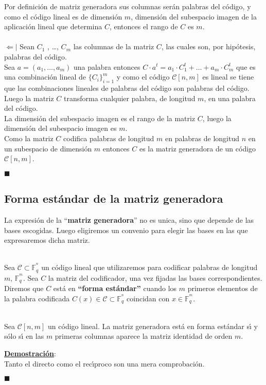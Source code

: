 Por definici\'on de matriz generadora sus columnas ser\'an palabras del
c\'odigo, y como el c\'odigo lineal es de dimensi\'on $m$, dimensi\'on
del subespacio imagen de la aplicaci\'on lineal que determina $C$, entonces
el rango de $C$ es $m$.\\ \\
%
$\Leftarrow |$ Sean $C_1$ , \dots, $C_m$ las columnas de la matriz $C$, las
cuales son, por hip\'otesis, palabras del c\'odigo.\\

Sea $a=(a_1,\dots,a_m )$ una palabra entonces $C\cdot a^t = a_1\cdot
C_1^t+\dots +a_m\cdot C_m^t$ que es una combinaci\'on lineal de
$\{C_i \}_{i=1}^m$ y como el c\'odigo $\mathcal{C}[n,m]$ es lineal se tiene
que las combinaciones lineales de palabras del c\'odigo son palabras del 
c\'odigo. Luego la matriz $C$ transforma cualquier palabra, de longitud $m$, 
en una palabra del c\'odigo.\\

La dimensi\'on del subespacio imagen es el rango de la matriz $C$, luego la
dimensi\'on del subespacio imagen es $m$.\\

Como la matriz $C$ codifica palabras de longitud $m$ en palabras de longitud
$n$ en un subespacio de dimensi\'on $m$ entonces $C$ es la matriz generadora
de un c\'odigo $\mathcal{C}[n,m]$.
\begin{flushright}
$\blacksquare$
\end{flushright}
%
\newpage
%
\subsection{Forma est\'andar de la matriz generadora}

La expresi\'on de la ``\textbf{matriz generadora}'' no es unica, sino que
depende de las bases escogidas. Luego eligiremos un convenio para elegir
las bases en las que expresaremos dicha matriz.
\begin{definicion}
\ \\
Sea $\mathcal{C}\subset \mathbb{F}^{^n}_q$ un c\'odigo lineal que utilizaremos
para codificar palabras de longitud $m$, $\mathbb{F}^{^m}_q$. Sea $C$ la
matriz del codificador, una vez fijadas las bases correspondientes. Diremos
que $C$ est\'a en \textbf{``forma est\'andar''} cuando los $m$ primeros elementos
de la palabra codificada $C(x)\in \mathcal{C}\subset \mathbb{F}^{^n}_q$
coincidan con $x\in \mathbb{F}^{^m}_q$.
\end{definicion}
\begin{proposicion}
\ \\
Sea $\mathcal{C}[n,m]$ un c\'odigo lineal. La matriz generadora est\'a en 
forma est\'andar s\'{\i} y s\'olo s\'{\i} en las $m$ primeras columnas
aparece la matriz identidad de orden $m$.
\end{proposicion}
\underline{\textbf{Demostraci\'on}}:\\
Tanto el directo como el rec\'{\i}proco son una mera comprobaci\'on.
\begin{flushright}
$\blacksquare$
\end{flushright}
